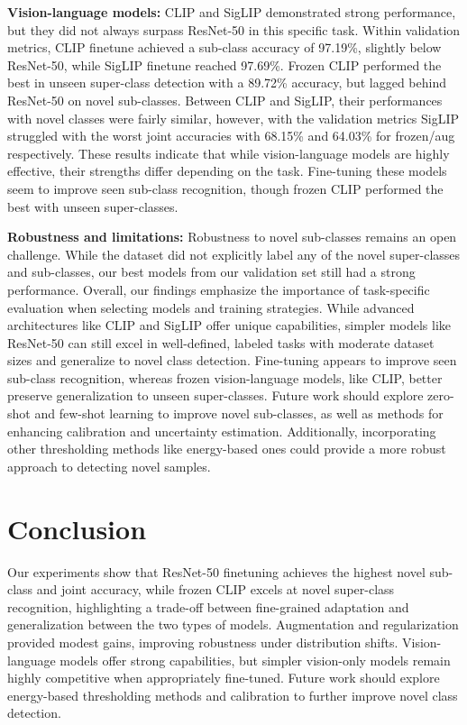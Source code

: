 \documentclass{article}
\begin{document}
\textbf{Vision-language models:} CLIP and SigLIP demonstrated strong performance, but they did not always surpass ResNet-50 in this specific task. Within validation metrics, CLIP finetune achieved a sub-class accuracy of 97.19\%, slightly below ResNet-50, while SigLIP finetune reached 97.69\%. Frozen CLIP performed the best in unseen super-class detection with a 89.72\% accuracy, but lagged behind ResNet-50 on novel sub-classes. Between CLIP and SigLIP, their performances with novel classes were fairly similar, however, with the validation metrics SigLIP struggled with the worst joint accuracies with 68.15\% and 64.03\% for frozen/aug respectively. These results indicate that while vision-language models are highly effective, their strengths differ depending on the task. Fine-tuning these models seem to improve seen sub-class recognition, though frozen CLIP performed the best with unseen super-classes. 

\textbf{Robustness and limitations:} Robustness to novel sub-classes remains an open challenge. While the dataset did not explicitly label any of the novel super-classes and sub-classes, our best models from our validation set still had a strong performance. Overall, our findings emphasize the importance of task-specific evaluation when selecting models and training strategies. While advanced architectures like CLIP and SigLIP offer unique capabilities, simpler models like ResNet-50 can still excel in well-defined, labeled tasks with moderate dataset sizes and generalize to novel class detection. Fine-tuning appears to improve seen sub-class recognition, whereas frozen vision-language models, like CLIP, better preserve generalization to unseen super-classes. Future work should explore zero-shot and few-shot learning to improve novel sub-classes, as well as methods for enhancing calibration and uncertainty estimation. Additionally, incorporating other thresholding methods like energy-based ones could provide a more robust approach to detecting novel samples.

\section{Conclusion}
Our experiments show that ResNet-50 finetuning achieves the highest novel sub-class and joint accuracy, while frozen CLIP excels at novel super-class recognition, highlighting a trade-off between fine-grained adaptation and generalization between the two types of models. Augmentation and regularization provided modest gains, improving robustness under distribution shifts. Vision-language models offer strong capabilities, but simpler vision-only models remain highly competitive when appropriately fine-tuned. Future work should explore energy-based thresholding methods and calibration to further improve novel class detection.
\end{document}
